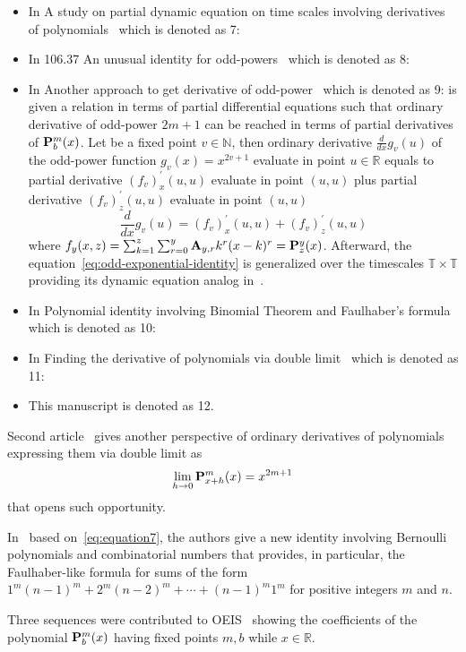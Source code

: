 \begin{itemize}
    \item In A study on partial dynamic equation on time scales involving derivatives
    of polynomials~\cite{kolosov2016study} which is denoted as 7:
    \item In 106.37 An unusual identity for odd-powers~\cite{kolosov2022106} which is denoted as 8:
    \item In Another approach to get derivative of odd-power~\cite{kolosov2023another} which is denoted as 9:
    is given a relation in terms of partial differential equations such that
    ordinary derivative of odd-power $2m+1$ can be reached in terms of partial derivatives of ${\mathbf{P}}\sp{m} \sb{b}(x)$.
    Let be a fixed point $v\in \mathbb{N}$, then ordinary derivative $\frac{d}{dx} g_v (u)$ of the odd-power function $g_v(x) = x^{2v + 1}$
    evaluate in point $u\in\mathbb{R}$ equals to partial derivative $(f_{v})^{'}_{x} (u, u)$ evaluate in point $(u, u)$ plus
    partial derivative $(f_{v})^{'}_{z} (u, u)$ evaluate in point $(u, u)$
    \begin{equation}
        \frac{d}{dx} g_v (u) = (f_{v})^{'}_{x} (u, u) + (f_{v})^{'}_{z} (u, u)
        \label{eq:odd-exponential-identity}
    \end{equation}
    where $f_{y} (x, z) = \sum_{k=1}^{z} \sum_{r=0}^{y} {\mathbf{A}} \sb{y,r} k^r (x-k)^r = {\mathbf{P}}\sp{y} \sb{z}(x)$.
    Afterward, the equation~\eqref{eq:odd-exponential-identity}
    is generalized over the timescales $\mathbb{T} \times \mathbb{T}$ providing its dynamic equation analog
    in~\cite{kolosov2016study}.
    \item In Polynomial identity involving Binomial Theorem and Faulhaber's formula~\cite{kolosov2023polynomial}
    which is denoted as 10:
    \item In Finding the derivative of polynomials via double limit~\cite{kolosov_2024_10575485} which is denoted as 11:
    \item This manuscript is denoted as 12.


\end{itemize}

Second article~\cite{kolosov_2024_10575485} gives another perspective of ordinary derivatives of polynomials expressing
them via double limit as
\begin{align*}
    \lim_{h \to 0} {\mathbf{P}}\sp{m} \sb{x+h}(x) = x^{2m+1}
\end{align*}
that opens such opportunity.

In~\cite{barbero2020two} based on~\eqref{eq:equation7}, the authors give a new identity involving
Bernoulli polynomials and combinatorial numbers that provides,
in particular, the Faulhaber-like formula for sums of the form $1^m(n-1)^m + 2^m (n -2)^m + \cdots + (n - 1)^m 1^m$ for
positive integers $m$ and $n$.

Three sequences were contributed to
OEIS~\cite{kolosov2018coefficientspolynomial1, kolosov2018coefficientspolynomial2, kolosov2018coefficientspolynomial3}
showing the coefficients of the polynomial ${\mathbf{P}}\sp{m} \sb{b}(x)$ having fixed points $m,b$ while $x\in\mathbb{R}$.
